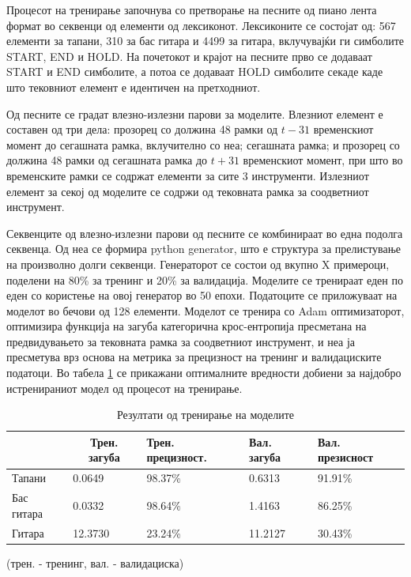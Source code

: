 Процесот на тренирање започнува со претворање на песните од пиано лента формат во секвенци од елементи од лексиконот. Лексиконите се состојат од: 567 елементи за тапани, 310 за бас гитара и 4499 за гитара, вклучувајќи ги симболите START, END и HOLD. На почетокот и крајот на песните прво се додаваат  START и END симболите, а потоа се додаваат HOLD симболите секаде каде што тековниот елемент е идентичен на претходниот. 

Од песните се градат влезно-излезни парови за моделите. Влезниот елемент е составен од три дела: прозорец со должина 48 рамки од $t-31$ временскиот момент до сегашната рамка, вклучително со неа; сегашната рамка; и прозорец со должина 48 рамки од сегашната рамка до $t+31$ временскиот момент, при што во временските рамки се содржат елементи за сите 3 инструменти. Излезниот елемент за секој од моделите се содржи од тековната рамка за соодветниот инструмент.

Секвенците од влезно-излезни парови од песните се комбинираат во една подолга секвенца. Од неа се формира python generator, што е структура за прелистување на произволно долги секвенци. Генераторот се состои од вкупно X примероци, поделени на 80\% за тренинг и 20\% за валидација. Моделите се тренираат еден по еден со користење на овој генератор во 50 епохи. Податоците се приложуваат на моделот во бечови од 128 елементи. Моделот се тренира со Adam оптимизаторот, оптимизира функција на загуба категорична крос-ентропија пресметана на предвидувањето за тековната рамка за соодветниот инструмент, и неа ја пресметува врз основа на метрика за прецизност на тренинг и валидациските податоци. Во табела \ref{tab:trening} се прикажани оптималните вредности добиени за најдобро истренираниот модел од процесот на тренирање.

\begin{table}[H]
\centering
\begin{tabular}{@{}lllll@{}}
\toprule
           & \multicolumn{1}{c}{Трен. загуба} & Трен. прецизност. & Вал. загуба & Вал. презисност                   \\ \midrule
Тапани          &   0.0649              &  98.37\%              &  0.6313               &    91.91\%    \\
Бас гитара      &   0.0332              &  98.64\%              &  1.4163               &    86.25\%    \\
Гитара          &   12.3730             &  23.24\%              &  11.2127              &    30.43\%    \\ \bottomrule
\end{tabular}
\caption{Резултати од тренирање на моделите}
(трен. - тренинг, вал. - валидациска)
\label{tab:trening}
\end{table}


